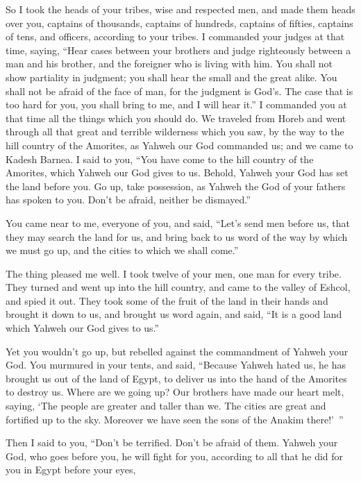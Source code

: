 {So I took the heads of your tribes, wise and respected men, and made them heads over you, captains of thousands, captains of hundreds, captains of fifties, captains of tens, and officers, according to your tribes.
I commanded your judges at that time, saying, “Hear cases between your brothers and judge righteously between a man and his brother, and the foreigner who is living with him.
You shall not show partiality in judgment; you shall hear the small and the great alike. You shall not be afraid of the face of man, for the judgment is God’s. The case that is too hard for you, you shall bring to me, and I will hear it.”
I commanded you at that time all the things which you should do.
We traveled from Horeb and went through all that great and terrible wilderness which you saw, by the way to the hill country of the Amorites, as Yahweh our God commanded us; and we came to Kadesh Barnea.
I said to you, “You have come to the hill country of the Amorites, which Yahweh our God gives to us.
Behold, Yahweh your God has set the land before you. Go up, take possession, as Yahweh the God of your fathers has spoken to you. Don’t be afraid, neither be dismayed.”
\par }{\PP {}You came near to me, everyone of you, and said, “Let’s send men before us, that they may search the land for us, and bring back to us word of the way by which we must go up, and the cities to which we shall come.”
\par }{\PP {}The thing pleased me well. I took twelve of your men, one man for every tribe.
They turned and went up into the hill country, and came to the valley of Eshcol, and spied it out.
They took some of the fruit of the land in their hands and brought it down to us, and brought us word again, and said, “It is a good land which Yahweh our God gives to us.”
\par }{\PP {}Yet you wouldn’t go up, but rebelled against the commandment of Yahweh your God.
You murmured in your tents, and said, “Because Yahweh hated us, he has brought us out of the land of Egypt, to deliver us into the hand of the Amorites to destroy us.
Where are we going up? Our brothers have made our heart melt, saying, ‘The people are greater and taller than we. The cities are great and fortified up to the sky. Moreover we have seen the sons of the Anakim there!’ ”
\par }{\PP {}Then I said to you, “Don’t be terrified. Don’t be afraid of them.
Yahweh your God, who goes before you, he will fight for you, according to all that he did for you in Egypt before your eyes,
}

